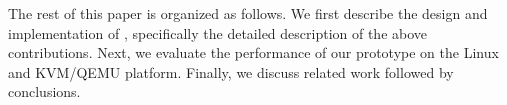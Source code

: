 
The rest of this paper is organized as follows.
We first describe the design and implementation of \sna,
specifically the detailed description of the above contributions.
Next, we evaluate the performance of our \na prototype
on the Linux and KVM/QEMU platform.
Finally, we discuss related work followed by conclusions.

